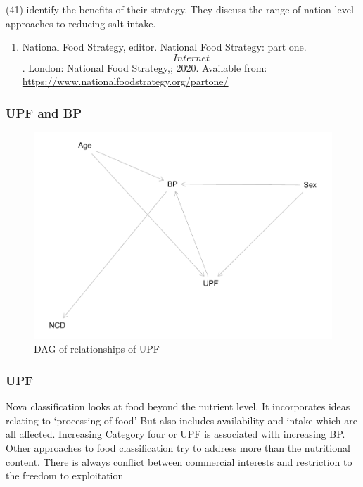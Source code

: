 \documentclass[
]{article}
\providecommand{\tightlist}{%
  \setlength{\itemsep}{0pt}\setlength{\parskip}{0pt}}
\begin{document}
(41) identify the benefits of their strategy. They discuss the range of
nation level approaches to reducing salt intake.

\begin{enumerate}
\def\labelenumi{\arabic{enumi}.}
\setcounter{enumi}{5}
\tightlist
\item
  National Food Strategy, editor. National Food Strategy: part one.
  \[Internet\]. London: National Food Strategy,; 2020. Available from:
  \url{https://www.nationalfoodstrategy.org/partone/}
\end{enumerate}

\hypertarget{upf-and-bp}{%
\subsubsection{UPF and BP}\label{upf-and-bp}}

\begin{figure}
\centering
\includegraphics{methodandresults_files/figure-latex/fig-dag-upf-1.pdf}
\caption{DAG of relationships of UPF}
\end{figure}

\hypertarget{upf}{%
\subsubsection{UPF}\label{upf}}

Nova classification looks at food beyond the nutrient level. It
incorporates ideas relating to `processing of food' But also includes
availability and intake which are all affected. Increasing Category four
or UPF is associated with increasing BP. Other approaches to food
classification try to address more than the nutritional content. There
is always conflict between commercial interests and restriction to the
freedom to exploitation
\end{document}
